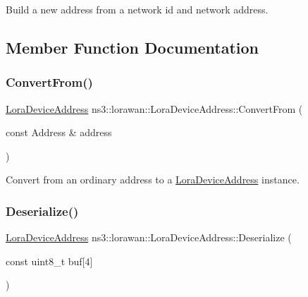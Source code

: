 Build a new address from a network id and network address. 

\subsection{Member Function Documentation}
\mbox{\label{classns3_1_1lorawan_1_1LoraDeviceAddress_a4af705a1745ff8e6ced236cde559acf7}} 
\subsubsection{\texorpdfstring{Convert\+From()}{ConvertFrom()}}
{\footnotesize\ttfamily \hyperlink{classns3_1_1lorawan_1_1LoraDeviceAddress}{Lora\+Device\+Address} ns3\+::lorawan\+::\+Lora\+Device\+Address\+::\+Convert\+From (\begin{DoxyParamCaption}\item[{const Address \&}]{address }\end{DoxyParamCaption})\hspace{0.3cm}{\ttfamily [static]}}

Convert from an ordinary address to a \hyperlink{classns3_1_1lorawan_1_1LoraDeviceAddress}{Lora\+Device\+Address} instance. \mbox{\label{classns3_1_1lorawan_1_1LoraDeviceAddress_a440a7f5011c5051efed2aa7d5ae6c5f4}} 
\subsubsection{\texorpdfstring{Deserialize()}{Deserialize()}}
{\footnotesize\ttfamily \hyperlink{classns3_1_1lorawan_1_1LoraDeviceAddress}{Lora\+Device\+Address} ns3\+::lorawan\+::\+Lora\+Device\+Address\+::\+Deserialize (\begin{DoxyParamCaption}\item[{const uint8\+\_\+t}]{buf\mbox{[}4\mbox{]} }\end{DoxyParamCaption})\hspace{0.3cm}{\ttfamily [static]}}

